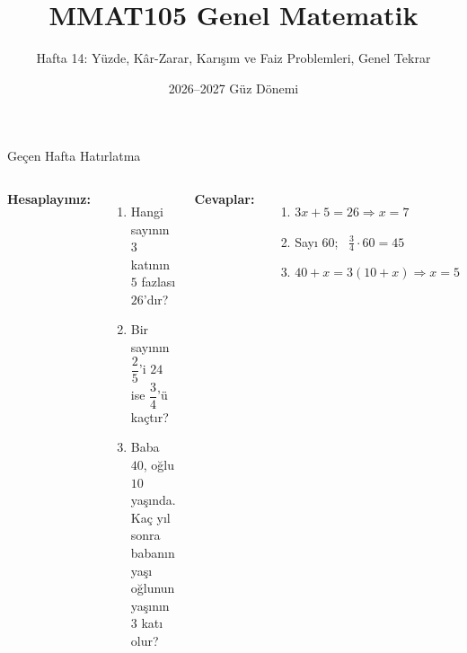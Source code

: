 \documentclass[aspectratio=169,11pt]{beamer}
\title[MMAT105 -- Hafta 14]{MMAT105 Genel Matematik}
\subtitle{Hafta 14: Yüzde, Kâr-Zarar, Karışım ve Faiz Problemleri, Genel Tekrar}
\author{}
\date{2026--2027 Güz Dönemi}
\begin{document}
\begin{frame}
\titlepage
\end{frame}



\begin{frame}{Geçen Hafta Hatırlatma}
\begin{columns}[t]
\textbf{Hesaplayınız:}
\begin{enumerate}
\item Hangi sayının \(3\) katının \(5\) fazlası \(26\)'dır?
\item Bir sayının \(\dfrac{2}{5}\)'i \(24\) ise \(\dfrac{3}{4}\)'ü kaçtır?
\item Baba \(40\), oğlu \(10\) yaşında. Kaç yıl sonra babanın yaşı oğlunun yaşının \(3\) katı olur?
\end{enumerate}
\pause
\textbf{Cevaplar:}
\begin{enumerate}
\item \(3x+5=26\Rightarrow x=7\)
\item Sayı \(60\); \ \(\tfrac{3}{4}\cdot 60=45\)
\item \(40+x=3(10+x)\Rightarrow x=5\)
\end{enumerate}
\end{columns}
\end{frame}
\end{document}
